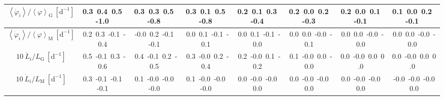 \begin{table}[H]
{\begin{centering}
\begin{tabular}{|c|c|c|c|c|c|c|c|}
$\left\langle \dot{\varphi}_{i}\right\rangle /\left\langle \varphi\right\rangle _{\mathrm{G}}\ \left[\mathrm{d^{-1}}\right]$ & \textcolor{C1}{0.3}\ \textcolor{C2}{0.4}\ \textcolor{C3}{0.5}\ \textcolor{C4}{-1.0}\  & \textcolor{C1}{0.3}\ \textcolor{C2}{0.3}\ \textcolor{C3}{0.5}\ \textcolor{C4}{-0.8}\  & \textcolor{C1}{0.3}\ \textcolor{C2}{0.1}\ \textcolor{C3}{0.5}\ \textcolor{C4}{-0.8}\  & \textcolor{C1}{0.2}\ \textcolor{C2}{0.1}\ \textcolor{C3}{0.3}\ \textcolor{C4}{-0.4}\  & \textcolor{C1}{0.2}\ \textcolor{C2}{0.0}\ \textcolor{C3}{0.2}\ \textcolor{C4}{-0.3}\  & \textcolor{C1}{0.2}\ \textcolor{C2}{0.0}\ \textcolor{C3}{0.1}\ \textcolor{C4}{-0.1}\  & \textcolor{C1}{0.1}\ \textcolor{C2}{0.0}\ \textcolor{C3}{0.2}\ \textcolor{C4}{-0.1}\  \tabularnewline
\hline
$\left\langle \dot{\varphi}_{i}\right\rangle /\left\langle \varphi\right\rangle _{\mathrm{M}}\ \left[\mathrm{d^{-1}}\right]$ & \textcolor{C1}{0.2}\ \textcolor{C2}{0.3}\ \textcolor{C3}{-0.1}\ \textcolor{C4}{-0.4}\  & \textcolor{C1}{-0.0}\ \textcolor{C2}{0.2}\ \textcolor{C3}{-0.1}\ \textcolor{C4}{-0.1}\  & \textcolor{C1}{0.0}\ \textcolor{C2}{0.1}\ \textcolor{C3}{-0.1}\ \textcolor{C4}{-0.1}\  & \textcolor{C1}{0.0}\ \textcolor{C2}{0.1}\ \textcolor{C3}{-0.1}\ \textcolor{C4}{-0.0}\  & \textcolor{C1}{0.0}\ \textcolor{C2}{0.0}\ \textcolor{C3}{-0.0}\ \textcolor{C4}{-0.1}\  & \textcolor{C1}{0.0}\ \textcolor{C2}{0.0}\ \textcolor{C3}{-0.0}\ \textcolor{C4}{-0.0}\  & \textcolor{C1}{0.0}\ \textcolor{C2}{0.0}\ \textcolor{C3}{-0.0}\ \textcolor{C4}{-0.0}\  \tabularnewline
\hline
$10\ \dot{L}_{i}/L_{\mathrm{G}}\ \left[\mathrm{d^{-1}}\right]$ & \textcolor{C1}{0.5}\ \textcolor{C2}{-0.1}\ \textcolor{C3}{0.3}\ \textcolor{C4}{-0.6}\  & \textcolor{C1}{0.4}\ \textcolor{C2}{-0.1}\ \textcolor{C3}{0.2}\ \textcolor{C4}{-0.5}\  & \textcolor{C1}{0.3}\ \textcolor{C2}{-0.0}\ \textcolor{C3}{0.2}\ \textcolor{C4}{-0.4}\  & \textcolor{C1}{0.2}\ \textcolor{C2}{-0.0}\ \textcolor{C3}{0.1}\ \textcolor{C4}{-0.2}\  & \textcolor{C1}{0.1}\ \textcolor{C2}{-0.0}\ \textcolor{C3}{0.0}\ \textcolor{C4}{-0.0}\  & \textcolor{C1}{0.0}\ \textcolor{C2}{-0.0}\ \textcolor{C3}{0.0}\ \textcolor{C4}{0.0}\  & \textcolor{C1}{0.0}\ \textcolor{C2}{-0.0}\ \textcolor{C3}{0.0}\ \textcolor{C4}{0.0}\  \tabularnewline
\hline
$10\ \dot{L}_{i}/L_{\mathrm{M}}\ \left[\mathrm{d^{-1}}\right]$ & \textcolor{C1}{0.3}\ \textcolor{C2}{-0.1}\ \textcolor{C3}{-0.1}\ \textcolor{C4}{-0.1}\  & \textcolor{C1}{0.1}\ \textcolor{C2}{-0.0}\ \textcolor{C3}{-0.0}\ \textcolor{C4}{-0.0}\  & \textcolor{C1}{0.1}\ \textcolor{C2}{-0.0}\ \textcolor{C3}{-0.0}\ \textcolor{C4}{-0.0}\  & \textcolor{C1}{0.0}\ \textcolor{C2}{-0.0}\ \textcolor{C3}{-0.0}\ \textcolor{C4}{0.0}\  & \textcolor{C1}{0.0}\ \textcolor{C2}{-0.0}\ \textcolor{C3}{-0.0}\ \textcolor{C4}{0.0}\  & \textcolor{C1}{0.0}\ \textcolor{C2}{-0.0}\ \textcolor{C3}{-0.0}\ \textcolor{C4}{0.0}\  & \textcolor{C1}{-0.0}\ \textcolor{C2}{-0.0}\ \textcolor{C3}{-0.0}\ \textcolor{C4}{0.0}\  \tabularnewline

\end{tabular}
\end{centering}}
\end{table}
